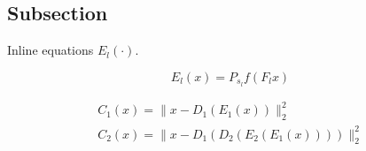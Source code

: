 \subsection{Subsection}
Inline equations $E_{l}(\cdot)$.

\begin{equation}
E_{l}(x) = P_{s_l}f(F_{l}x)
\label{eq:encoder}
\end{equation}

\begin{gather}
C_1(x) = \| x - D_{1}(E_{1}(x)) \|_{2}^{2} \\
C_2(x) = \| x - D_{1}(D_{2}(E_{2}(E_{1}(x)))) \|_{2}^{2}
\label{eq:layer_cost}
\end{gather}